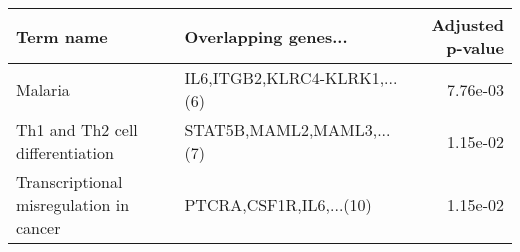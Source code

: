 \begin{tabular}{llr}
\toprule
                              Term name &         Overlapping genes... &  Adjusted p-value \\
\midrule
                                Malaria & IL6,ITGB2,KLRC4-KLRK1,...(6) &          7.76e-03 \\
       Th1 and Th2 cell differentiation &    STAT5B,MAML2,MAML3,...(7) &          1.15e-02 \\
Transcriptional misregulation in cancer &      PTCRA,CSF1R,IL6,...(10) &          1.15e-02 \\
\bottomrule
\end{tabular}
